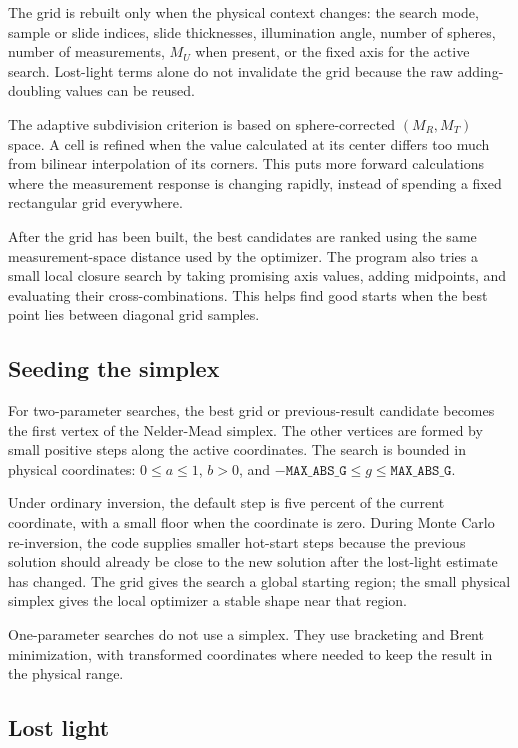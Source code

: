 \documentclass{article}
\begin{document}
The grid is rebuilt only when the physical context changes: the search mode,
sample or slide indices, slide thicknesses, illumination angle, number of
spheres, number of measurements, $M_U$ when present, or the fixed axis for the
active search.  Lost-light terms alone do not invalidate the grid because the
raw adding-doubling values can be reused.

The adaptive subdivision criterion is based on sphere-corrected
$(M_R,M_T)$ space.  A cell is refined when the value calculated at its center
differs too much from bilinear interpolation of its corners.  This puts more
forward calculations where the measurement response is changing rapidly,
instead of spending a fixed rectangular grid everywhere.

After the grid has been built, the best candidates are ranked using the same
measurement-space distance used by the optimizer.  The program also tries a
small local closure search by taking promising axis values, adding midpoints,
and evaluating their cross-combinations.  This helps find good starts when the
best point lies between diagonal grid samples.

\subsection{Seeding the simplex}

For two-parameter searches, the best grid or previous-result candidate becomes
the first vertex of the Nelder-Mead simplex.  The other vertices are formed by
small positive steps along the active coordinates.  The search is bounded in
physical coordinates: $0\le a\le1$, $b>0$, and
$-\mathtt{MAX\_ABS\_G}\le g\le\mathtt{MAX\_ABS\_G}$.

Under ordinary inversion, the default step is five percent of the current
coordinate, with a small floor when the coordinate is zero.  During Monte Carlo
re-inversion, the code supplies smaller hot-start steps because the previous
solution should already be close to the new solution after the lost-light
estimate has changed.  The grid gives the search a global starting region; the
small physical simplex gives the local optimizer a stable shape near that
region.

One-parameter searches do not use a simplex.  They use bracketing and Brent
minimization, with transformed coordinates where needed to keep the result in
the physical range.

\subsection{Lost light}
\end{document}
